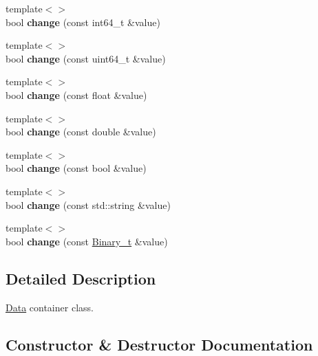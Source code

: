 \begin{DoxyCompactItemize}
{\footnotesize template$<$$>$ }\\bool {\bfseries change} (const int64\+\_\+t \&value)
\item 
\mbox{\label{classsf_1_1Data_a2e67db10d44212ed9f1b2e0229024ebc}} 
{\footnotesize template$<$$>$ }\\bool {\bfseries change} (const uint64\+\_\+t \&value)
\item 
\mbox{\label{classsf_1_1Data_a5055ec41fd0add2d048bdd715f1e230d}} 
{\footnotesize template$<$$>$ }\\bool {\bfseries change} (const float \&value)
\item 
\mbox{\label{classsf_1_1Data_a697924f93bdf53a7ceaefce10da0bacd}} 
{\footnotesize template$<$$>$ }\\bool {\bfseries change} (const double \&value)
\item 
\mbox{\label{classsf_1_1Data_a49cd4b4f6565ef8958e00a4f09a19e3a}} 
{\footnotesize template$<$$>$ }\\bool {\bfseries change} (const bool \&value)
\item 
\mbox{\label{classsf_1_1Data_a5aac71e00c0c6703308ca37c782ff4b7}} 
{\footnotesize template$<$$>$ }\\bool {\bfseries change} (const std\+::string \&value)
\item 
\mbox{\label{classsf_1_1Data_a08c2f84222ff2af793f6df50f497fc10}} 
{\footnotesize template$<$$>$ }\\bool {\bfseries change} (const \hyperlink{namespacesf_a3cfcc379b8afaf098c4e1aa67ef92186}{Binary\+\_\+t} \&value)
\end{DoxyCompactItemize}


\subsection{Detailed Description}
\hyperlink{classsf_1_1Data}{Data} container class. 

\subsection{Constructor \& Destructor Documentation}
\mbox{\label{classsf_1_1Data_a769fa07620e67e3d5a6d496f8777e770}} 
